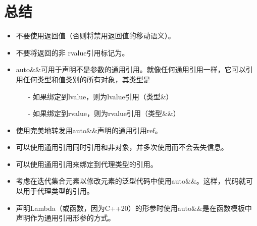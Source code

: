 \section{总结}
\begin{itemize}
	\item 不要使用返回值（否则将禁用返回值的移动语义）。
	\item 不要将返回的非 rvalue引用标记为。
	\item auto\&\&可用于声明不是参数的通用引用。就像任何通用引用一样，它可以引用任何类型和值类别的所有对象，其类型是
	\begin{itemize}
		\item[-] 如果绑定到lvalue，则为lvalue引用（类型\&）
		\item[-] 如果绑定到rvalue，则为rvalue引用（类型\&\&）
	\end{itemize}
	\item 使用完美地转发用auto\&\&声明的通用引用ref。
	\item 可以使用通用引用同时引用和非对象，并多次使用而不会丢失信息。
	\item 可以使用通用引用来绑定到代理类型的引用。
	\item 考虑在迭代集合元素以修改元素的泛型代码中使用auto\&\&。这样，代码就可以用于代理类型的引用。
	\item 声明Lambda（或函数，因为C++20）的形参时使用auto\&\&是在函数模板中声明作为通用引用形参的方式。
\end{itemize}


